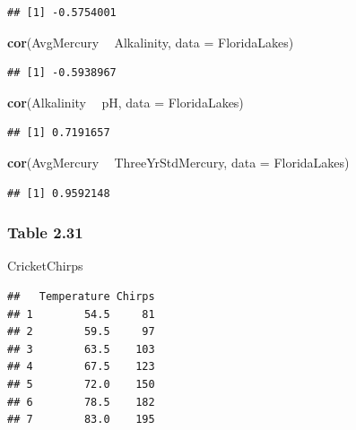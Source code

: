 \documentclass[]{book}
\newenvironment{Shaded}{\begin{snugshade}}{\end{snugshade}}
\newcommand{\DataTypeTok}[1]{\textcolor[rgb]{0.13,0.29,0.53}{#1}}
\newcommand{\KeywordTok}[1]{\textcolor[rgb]{0.13,0.29,0.53}{\textbf{#1}}}
\newcommand{\NormalTok}[1]{#1}
\newcommand{\OperatorTok}[1]{\textcolor[rgb]{0.81,0.36,0.00}{\textbf{#1}}}
\newcommand{\StringTok}[1]{\textcolor[rgb]{0.31,0.60,0.02}{#1}}
\begin{document}
\begin{verbatim}
## [1] -0.5754001
\end{verbatim}

\begin{Shaded}
\begin{Highlighting}[]
\KeywordTok{cor}\NormalTok{(AvgMercury }\OperatorTok{~}\StringTok{ }\NormalTok{Alkalinity, }\DataTypeTok{data =}\NormalTok{ FloridaLakes)}
\end{Highlighting}
\end{Shaded}

\begin{verbatim}
## [1] -0.5938967
\end{verbatim}

\begin{Shaded}
\begin{Highlighting}[]
\KeywordTok{cor}\NormalTok{(Alkalinity }\OperatorTok{~}\StringTok{ }\NormalTok{pH, }\DataTypeTok{data =}\NormalTok{ FloridaLakes)}
\end{Highlighting}
\end{Shaded}

\begin{verbatim}
## [1] 0.7191657
\end{verbatim}

\begin{Shaded}
\begin{Highlighting}[]
\KeywordTok{cor}\NormalTok{(AvgMercury }\OperatorTok{~}\StringTok{ }\NormalTok{ThreeYrStdMercury, }\DataTypeTok{data =}\NormalTok{ FloridaLakes)}
\end{Highlighting}
\end{Shaded}

\begin{verbatim}
## [1] 0.9592148
\end{verbatim}

\hypertarget{table-2.31}{%
\subsubsection{Table 2.31}\label{table-2.31}}

\begin{Shaded}
\begin{Highlighting}[]
\NormalTok{CricketChirps}
\end{Highlighting}
\end{Shaded}

\begin{verbatim}
##   Temperature Chirps
## 1        54.5     81
## 2        59.5     97
## 3        63.5    103
## 4        67.5    123
## 5        72.0    150
## 6        78.5    182
## 7        83.0    195
\end{verbatim}
\end{document}
